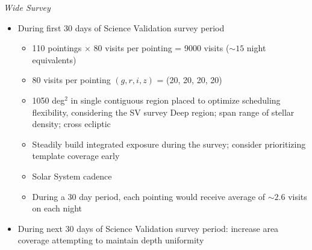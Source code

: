 \textit{Wide Survey}

\begin{itemize}

        \item During first 30 days of Science Validation survey period

        \begin{itemize}

                \item 110 pointings $\times$ 80 visits per pointing = 9000 visits ($\sim15$ night equivalents)
                \item 80 visits per pointing $(g, r, i, z)$ = (20, 20, 20, 20)
                \item 1050 deg$^2$  in single contiguous region placed to optimize scheduling flexibility, considering the SV survey Deep region; span range of stellar density; cross ecliptic
                \item Steadily build integrated exposure during the survey; consider prioritizing template coverage early
                \item Solar System cadence
                \item During a 30 day period, each pointing would receive average of $\sim2.6$ visits on each night

        \end{itemize}

        \item During next 30 days of Science Validation survey period: increase area coverage attempting to maintain depth uniformity

\end{itemize}


